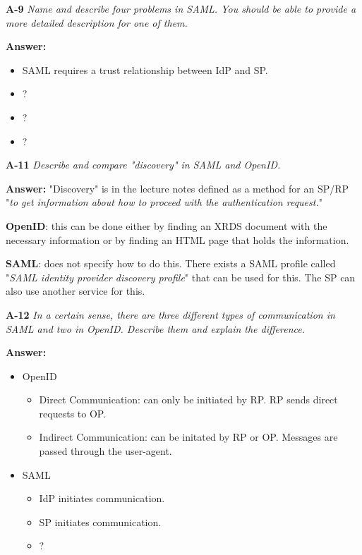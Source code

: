 \documentclass[a4paper]{article}
\newcommand{\Q}[2]{ \vspace{10pt} \textbf{A-#1} \textit{#2} }
\newcommand{\A}[1]{ \textbf{Answer:} #1 }
\begin{document}
\Q{9} {
    Name and describe four problems in SAML. You should be able to provide a 
    more detailed description for one of them.
}

\A{
   \begin{itemize} 
        \item SAML requires a trust relationship between IdP and SP.
        \item ?
        \item ?
        \item ?
   \end{itemize}
}

\Q{11} {
    Describe and compare "discovery" in SAML and OpenID.
}

\A{
    "Discovery" is in the lecture notes defined as 
    a method for an SP/RP
    "\textit{to get information about how to proceed with the 
    authentication request.}"

    \textbf{OpenID}: this can be done either by finding an XRDS
    document with the necessary information or by finding an
    HTML page that holds the information.

    \textbf{SAML}: does not specify how to do this. 
    There exists a SAML profile called
    "\textit{SAML identity provider discovery profile}"
    that can be used for this.
    The SP can also use another service for this.
}

\Q{12} {
    In a certain sense, there are three different types of communication in 
    SAML and two in OpenID. Describe them and explain the difference.
}

\A{
    \begin{itemize}
        \item OpenID
        \begin{itemize}
            \item Direct Communication: can only be initiated by RP.
                RP sends direct requests to OP.
            \item Indirect Communication: can be initated by RP or OP.
                Messages are passed through the user-agent.
        \end{itemize}
        \item SAML
        \begin{itemize}
            \item IdP initiates communication.
            \item SP initiates communication.
            \item ?
        \end{itemize}
    \end{itemize}
}
\end{document}
